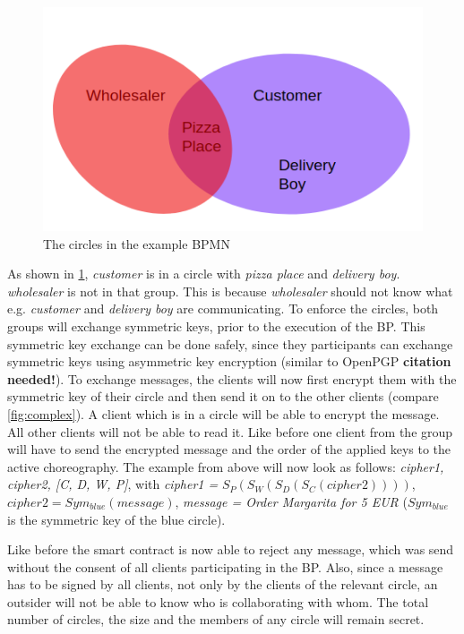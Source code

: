 \documentclass[runningheads]{llncs}
\begin{document}
\begin{figure}
    \centering
    \includegraphics[scale=0.6]{cicles.png}
    \caption{The circles in the example BPMN}
    \label{fig:circle}
\end{figure}


As shown in \ref{fig:circle}, \textit{customer} is in a circle with \textit{pizza place} and \textit{delivery boy}. \textit{wholesaler} is not in that group. This is because \textit{wholesaler} should not know what e.g. \textit{customer} and \textit{delivery boy} are communicating. To enforce the circles, both groups will exchange symmetric keys, prior to the execution of the BP. This symmetric key exchange can be done safely, since they participants can exchange symmetric keys using asymmetric key encryption (similar to OpenPGP  \textbf{citation needed!}). To exchange messages, the clients will now first encrypt them with the symmetric key of their circle and then send it on to the other clients (compare \ref{fig:complex}). A client which is in a circle will be able to encrypt the message. All other clients will not be able to read it. Like before one client from the group will have to send the encrypted message and the order of the applied keys to the active choreography. The example from above will now look as follows: \textit{cipher1, cipher2, [C, D, W, P]}, with \textit{cipher1 =} $S_P(S_W(S_D(S_C(cipher2))))$, $cipher2 = Sym_{blue}(message)$, \textit{message = Order Margarita for 5 EUR} ($Sym_{blue}$ is the symmetric key of the blue circle).

Like before the smart contract is now able to reject any message, which was send without the consent of all clients participating in the BP. Also, since a message has to be signed by all clients, not only by the clients of the relevant circle, an outsider will not be able to know who is collaborating with whom. The total number of circles, the size and the members of any circle will remain secret. 
\end{document}

